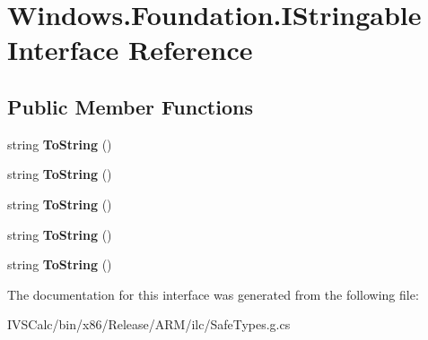 \hypertarget{interface_windows_1_1_foundation_1_1_i_stringable}{}\section{Windows.\+Foundation.\+I\+Stringable Interface Reference}
\label{interface_windows_1_1_foundation_1_1_i_stringable}
\subsection*{Public Member Functions}
\begin{DoxyCompactItemize}
\item 
\mbox{\label{interface_windows_1_1_foundation_1_1_i_stringable_a8f8af1b5f2fcd5703ed1d5c00b86a74d}} 
string {\bfseries To\+String} ()
\item 
\mbox{\label{interface_windows_1_1_foundation_1_1_i_stringable_a8f8af1b5f2fcd5703ed1d5c00b86a74d}} 
string {\bfseries To\+String} ()
\item 
\mbox{\label{interface_windows_1_1_foundation_1_1_i_stringable_a8f8af1b5f2fcd5703ed1d5c00b86a74d}} 
string {\bfseries To\+String} ()
\item 
\mbox{\label{interface_windows_1_1_foundation_1_1_i_stringable_a8f8af1b5f2fcd5703ed1d5c00b86a74d}} 
string {\bfseries To\+String} ()
\item 
\mbox{\label{interface_windows_1_1_foundation_1_1_i_stringable_a8f8af1b5f2fcd5703ed1d5c00b86a74d}} 
string {\bfseries To\+String} ()
\end{DoxyCompactItemize}


The documentation for this interface was generated from the following file\+:\begin{DoxyCompactItemize}
\item 
I\+V\+S\+Calc/bin/x86/\+Release/\+A\+R\+M/ilc/Safe\+Types.\+g.\+cs\end{DoxyCompactItemize}
